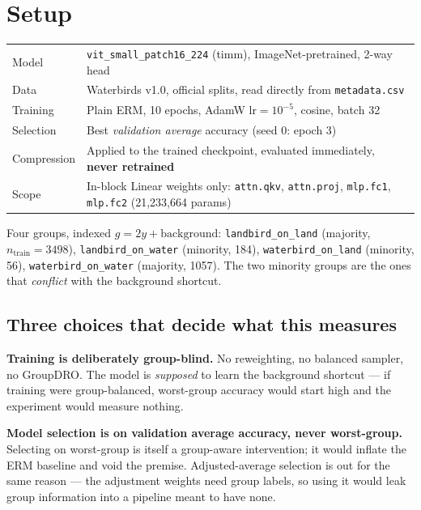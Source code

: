 \documentclass[11pt]{article}
\begin{document}
\section{Setup}

\begin{table}[h]
\centering
\footnotesize
\begin{tabular}{@{}ll@{}}
\toprule
Model & \texttt{vit\_small\_patch16\_224} (timm), ImageNet-pretrained, 2-way head \\
Data & Waterbirds v1.0, official splits, read directly from \texttt{metadata.csv} \\
Training & Plain ERM, 10 epochs, AdamW $\text{lr}=10^{-5}$, cosine, batch 32 \\
Selection & Best \emph{validation average} accuracy (seed 0: epoch 3) \\
Compression & Applied to the trained checkpoint, evaluated immediately, \textbf{never retrained} \\
Scope & In-block Linear weights only: \texttt{attn.qkv}, \texttt{attn.proj},
\texttt{mlp.fc1}, \texttt{mlp.fc2} (21{,}233{,}664 params) \\
\bottomrule
\end{tabular}
\end{table}

Four groups, indexed $g = 2y + \text{background}$: \texttt{landbird\_on\_land}
(majority, $n_{\text{train}}=3498$), \texttt{landbird\_on\_water} (minority, 184),
\texttt{waterbird\_on\_land} (minority, 56), \texttt{waterbird\_on\_water}
(majority, 1057). The two minority groups are the ones that \emph{conflict} with
the background shortcut.

\subsection*{Three choices that decide what this measures}

\textbf{Training is deliberately group-blind.} No reweighting, no balanced
sampler, no GroupDRO. The model is \emph{supposed} to learn the background
shortcut --- if training were group-balanced, worst-group accuracy would start
high and the experiment would measure nothing.

\textbf{Model selection is on validation average accuracy, never worst-group.}
Selecting on worst-group is itself a group-aware intervention; it would inflate
the ERM baseline and void the premise. Adjusted-average selection is out for the
same reason --- the adjustment weights need group labels, so using it would leak
group information into a pipeline meant to have none.
\end{document}
